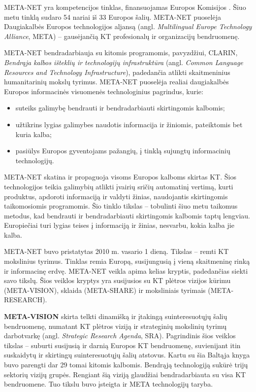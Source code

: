 \begin{multicols}{2}

META-NET yra kompetencijos tinklas, finansuojamas Europos Komisijos \cite{rehm2011}. Šiuo metu tinklą sudaro 54 nariai iš 33 Europos šalių. META-NET puoselėja Daugiakalbės Europos technologijos aljansą (angl. \textit{Multilingual Europe Technology Alliance}, META) – gausėjančią KT profesionalų ir organizacijų bendruomenę.

META-NET bendradarbiauja su kitomis programomis, pavyzdžiui, CLARIN, \textit{Bendrąja kalbos išteklių ir technologijų infrastruktūra} (angl. \textit{Common Language Resources and Technology Infrastructure}), padedančia atlikti skaitmeninius humanitarinių mokslų tyrimus. META-NET puoselėja realiai daugiakalbės Europos informacinės visuomenės technologinius pagrindus, kurie:

\begin{itemize}
\item suteiks galimybę bendrauti ir bendradarbiauti skirtingomis kalbomis;
\item užtikrins lygias galimybes naudotis informacija ir žiniomis, pateiktomis bet kuria kalba;
\item pasiūlys Europos gyventojams pažangių, į tinklą sujungtų informacinių technologijų.
\end{itemize}

META-NET skatina ir propaguoja visoms Europos kalboms skirtas KT. Šios technologijos teikia galimybių atlikti įvairių sričių automatinį vertimą, kurti produktus, apdoroti informaciją ir valdyti žinias, naudojantis skirtingomis taikomosiomis programomis. Šio tinklo tikslas – tobulinti šiuo metu taikomus metodus, kad bendrauti ir bendradarbiauti skirtingomis kalbomis taptų lengviau. Europiečiai turi lygias teises į informaciją ir žinias, nesvarbu, kokia kalba jie kalba.

META-NET buvo pristatytas 2010 m. vasario 1 dieną. Tikslas – remti KT mokslinius tyrimus. Tinklas remia Europą, susijungusią į vieną skaitmeninę rinką ir informacinę erdvę. META-NET veikla apima kelias kryptis, padedančias siekti savo tikslų. Šios veiklos kryptys yra susijusios su KT plėtros vizijos kūrimu (META-VISION), sklaida (META-SHARE) ir moksliniais tyrimais (META-RESEARCH).   

\textbf{META-VISION}  skirta telkti dinamišką ir įtakingą suinteresuotųjų šalių bendruomenę, numatant KT plėtros viziją ir strateginių mokslinių tyrimų darbotvarkę (angl. \textit{Strategic Research Agenda}, SRA). Pagrindinis šios veiklos tikslas – suburti susijusią ir darnią Europos KT bendruomenę, suvienijant itin suskaidytų ir skirtingų suinteresuotųjų šalių atstovus. Kartu su šia Baltąja knyga buvo parengti dar 29 tomai kitomis kalbomis. Bendrąją technologiją sukūrė trijų sektorių vizijų grupės. Rengiant šią viziją glaudžiai bendradarbiauta su visa KT bendruomene. Tuo tikslu buvo įsteigta ir META technologijų taryba.


\end{multicols}
